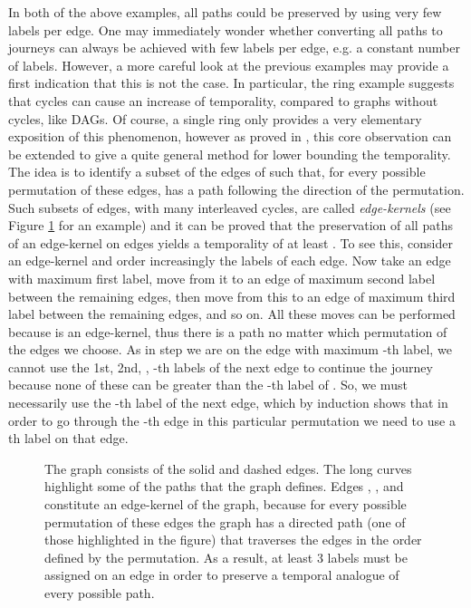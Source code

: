\documentclass[oribibl, 11pt]{llncs}
\begin{document}
In both of the above examples, all paths could be preserved by using very few labels per edge. One may immediately wonder whether converting all paths to journeys can always be achieved with few labels per edge, e.g. a constant number of labels. However, a more careful look at the previous examples may provide a first indication that this is not the case. In particular, the ring example suggests that cycles can cause an increase of temporality, compared to graphs without cycles, like DAGs. Of course, a single ring only provides a very elementary exposition of this phenomenon, however as proved in \cite{MMCS13}, this core observation can be extended to give a quite general method for lower bounding the temporality. The idea is to identify a subset of the edges of  such that, for every possible permutation of these edges,  has a path following the direction of the permutation. Such subsets of edges, with many interleaved cycles, are called \emph{edge-kernels} (see Figure \ref{fig:edge-kernel} for an example) and it can be proved that the preservation of all paths of an edge-kernel on  edges yields a temporality of at least . To see this, consider an edge-kernel  and order increasingly the labels of each edge. Now take an edge with maximum first label, move from it to an edge of maximum second label between the remaining edges, then move from this to an edge of maximum third label between the remaining edges, and so on. All these moves can be performed because  is an edge-kernel, thus there is a path no matter which permutation of the edges we choose. As in step  we are on the edge  with maximum -th label, we cannot use the 1st, 2nd, , -th labels of the next edge to continue the journey because none of these can be greater than the -th label of . So, we must necessarily use the -th label of the next edge, which by induction shows that in order to go through the -th edge in this particular permutation we need to use a th label on that edge.

\begin{figure}[!hbtp]
\caption{The graph consists of the solid and dashed edges. The long curves highlight some of the paths that the graph defines. Edges , , and  constitute an edge-kernel of the graph, because for every possible permutation of these edges the graph has a directed path (one of those highlighted in the figure) that traverses the edges in the order defined by the permutation. As a result, at least 3 labels must be assigned on an edge in order to preserve a temporal analogue of every possible path.} \label{fig:edge-kernel}
\end{figure}
\end{document}
